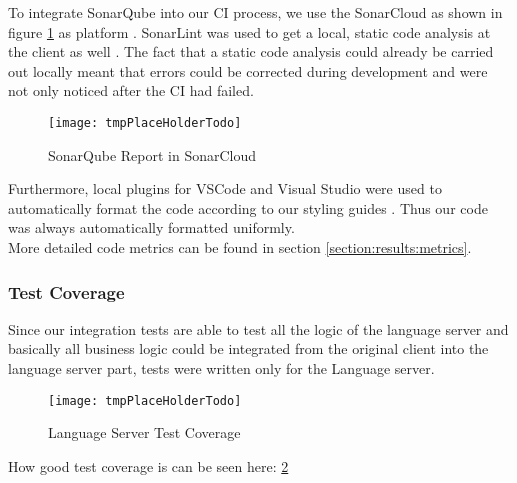 To integrate SonarQube into our CI process, we use the SonarCloud as shown in figure \ref{fig:sonarcloud_report}
as platform \cite{sonarcloud}.
SonarLint was used to get a local, static code analysis at the client as well \cite{sonar-lint}.
The fact that a static code analysis could already be carried out locally meant that errors
could be corrected during development and were not only noticed after the CI had failed.

\begin{figure}[H]
    \centering
    \texttt{[image: tmpPlaceHolderTodo]}
    \caption{SonarQube Report in SonarCloud}
    \label{fig:sonarcloud_report}
\end{figure}

Furthermore, local plugins for VSCode and Visual Studio were used to automatically
format the code according to our styling guides \cite{dev}.
Thus our code was always automatically formatted uniformly. \\

More detailed code metrics can be found in section \ref{section:results:metrics}.

\subsubsection{Test Coverage}
Since our integration tests are able to test all the logic of the language server
and basically all business logic could be integrated from the original client into the language server part,
tests were written only for the Language server.

\begin{figure}[H]
    \centering
    \texttt{[image: tmpPlaceHolderTodo]}
    \caption{Language Server Test Coverage}
    \label{fig:test_coverage}
\end{figure}

How good test coverage is can be seen here: \ref{fig:test_coverage}
